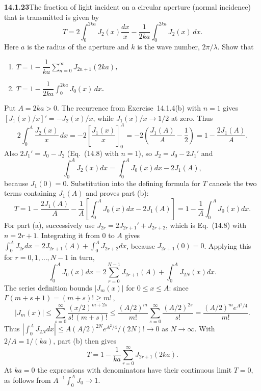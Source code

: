 \par\bigskip
\noindent\textbf{14.1.23}\quad The fraction of light incident on a
circular aperture (normal incidence) that is transmitted is given by
\[
T=2\int_{0}^{2ka}J_{2}(x)\frac{dx}{x}
-\frac{1}{2ka}\int_{0}^{2ka}J_{2}(x)\,dx.
\]
Here $a$ is the radius of the aperture and $k$ is the wave number,
$2\pi/\lambda$. Show that
\begin{enumerate}
\item[(a)] $T=1-\dfrac{1}{ka}\displaystyle\sum_{n=0}^{\infty}
J_{2n+1}(2ka)$,
\item[(b)] $T=1-\dfrac{1}{2ka}\displaystyle\int_{0}^{2ka}J_{0}(x)\,dx$.
\end{enumerate}
\solution
Put $A=2ka>0$. The recurrence from Exercise~14.1.4(b) with $n=1$ gives
$[J_1(x)/x]'=-J_2(x)/x$, while $J_1(x)/x\to1/2$ at zero. Thus
\[
2\int_0^A\frac{J_2(x)}x\,dx
=-2\left[\frac{J_1(x)}x\right]_0^A
=-2\left(\frac{J_1(A)}A-\frac12\right)
=1-\frac{2J_1(A)}A.
\]
Also $2J_1'=J_0-J_2$ (Eq.~(14.8) with $n=1$), so
$J_2=J_0-2J_1'$ and
\[
\int_0^A J_2(x)dx=\int_0^A J_0(x)dx-2J_1(A),
\]
because $J_1(0)=0$. Substitution into the defining formula for $T$
cancels the two terms containing $J_1(A)$ and proves part (b):
\[
T=1-\frac{2J_1(A)}A-\frac1A\left[\int_0^AJ_0(x)dx-2J_1(A)\right]
=\boxed{1-\frac1A\int_0^A J_0(x)dx}.
\]
For part (a), successively use $J_{2r}=2J_{2r+1}'+J_{2r+2}$, which is
Eq.~(14.8) with $n=2r+1$. Integrating it from $0$ to $A$ gives
$\int_0^AJ_{2r}dx=2J_{2r+1}(A)+\int_0^AJ_{2r+2}dx$, because
$J_{2r+1}(0)=0$. Applying this for $r=0,1,\ldots,N-1$ in turn,
\[
\int_0^A J_0(x)dx
=2\sum_{r=0}^{N-1}J_{2r+1}(A)+\int_0^A J_{2N}(x)dx.
\]
The series definition bounds $|J_m(x)|$ for $0\le x\le A$: since
$\Gamma(m+s+1)=(m+s)!\ge m!\,$,
\[
|J_m(x)|\le\sum_{s=0}^\infty\frac{(x/2)^{m+2s}}{s!\,(m+s)!}
\le\frac{(A/2)^m}{m!}\sum_{s=0}^\infty\frac{(A/2)^{2s}}{s!}
=\frac{(A/2)^m e^{A^2/4}}{m!}.
\]
Thus $|\int_0^AJ_{2N}dx|\le A(A/2)^{2N}e^{A^2/4}/(2N)!\to0$ as
$N\to\infty$. With $2/A=1/(ka)$, part (b) then gives
\[
\boxed{T=1-\frac1{ka}\sum_{r=0}^\infty J_{2r+1}(2ka)}.
\]
At $ka=0$ the expressions with denominators have their continuous
limit $T=0$, as follows from $A^{-1}\int_0^A J_0\to1$.


